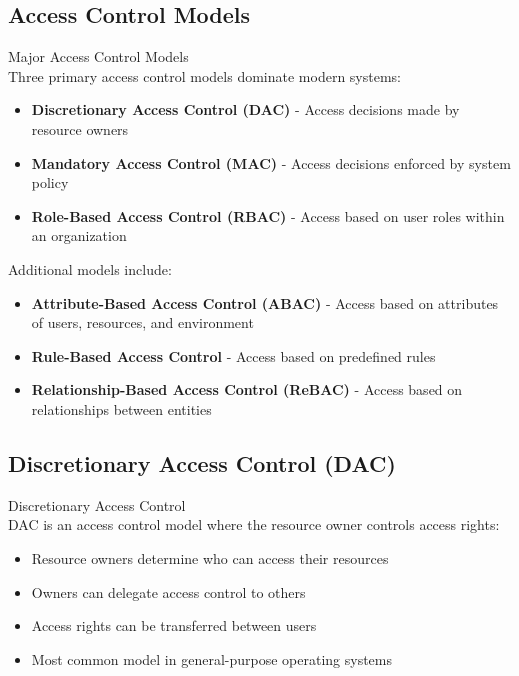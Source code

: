 \subsection{Access Control Models}

\begin{concept}{Major Access Control Models}\\
Three primary access control models dominate modern systems:
\begin{itemize}
    \item \textbf{Discretionary Access Control (DAC)} - Access decisions made by resource owners
    \item \textbf{Mandatory Access Control (MAC)} - Access decisions enforced by system policy
    \item \textbf{Role-Based Access Control (RBAC)} - Access based on user roles within an organization
\end{itemize}
Additional models include:
\begin{itemize}
    \item \textbf{Attribute-Based Access Control (ABAC)} - Access based on attributes of users, resources, and environment
    \item \textbf{Rule-Based Access Control} - Access based on predefined rules
    \item \textbf{Relationship-Based Access Control (ReBAC)} - Access based on relationships between entities
\end{itemize}
\end{concept}

\subsection{Discretionary Access Control (DAC)}

\begin{definition}{Discretionary Access Control}\\
DAC is an access control model where the resource owner controls access rights:
\begin{itemize}
    \item Resource owners determine who can access their resources
    \item Owners can delegate access control to others
    \item Access rights can be transferred between users
    \item Most common model in general-purpose operating systems
\end{itemize}
\end{definition}

